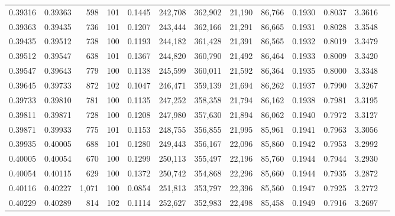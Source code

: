 \begin{tabular}{rrrrrrrrrrrrr}
0.39316 & 0.39363 &   598 & 101 &                                     0.1445 & 242,708 & 362,902 &  21,190 &  86,766 & 0.1930 & 0.8037 & 3.3616 \\
0.39363 & 0.39435 &   736 & 101 &                                     0.1207 & 243,444 & 362,166 &  21,291 &  86,665 & 0.1931 & 0.8028 & 3.3548 \\
0.39435 & 0.39512 &   738 & 100 &                                     0.1193 & 244,182 & 361,428 &  21,391 &  86,565 & 0.1932 & 0.8019 & 3.3479 \\
0.39512 & 0.39547 &   638 & 101 &                                     0.1367 & 244,820 & 360,790 &  21,492 &  86,464 & 0.1933 & 0.8009 & 3.3420 \\
0.39547 & 0.39643 &   779 & 100 &                                     0.1138 & 245,599 & 360,011 &  21,592 &  86,364 & 0.1935 & 0.8000 & 3.3348 \\
0.39645 & 0.39733 &   872 & 102 &                                     0.1047 & 246,471 & 359,139 &  21,694 &  86,262 & 0.1937 & 0.7990 & 3.3267 \\
0.39733 & 0.39810 &   781 & 100 &                                     0.1135 & 247,252 & 358,358 &  21,794 &  86,162 & 0.1938 & 0.7981 & 3.3195 \\
0.39811 & 0.39871 &   728 & 100 &                                     0.1208 & 247,980 & 357,630 &  21,894 &  86,062 & 0.1940 & 0.7972 & 3.3127 \\
0.39871 & 0.39933 &   775 & 101 &                                     0.1153 & 248,755 & 356,855 &  21,995 &  85,961 & 0.1941 & 0.7963 & 3.3056 \\
0.39935 & 0.40005 &   688 & 101 &                                     0.1280 & 249,443 & 356,167 &  22,096 &  85,860 & 0.1942 & 0.7953 & 3.2992 \\
0.40005 & 0.40054 &   670 & 100 &                                     0.1299 & 250,113 & 355,497 &  22,196 &  85,760 & 0.1944 & 0.7944 & 3.2930 \\
0.40054 & 0.40115 &   629 & 100 &                                     0.1372 & 250,742 & 354,868 &  22,296 &  85,660 & 0.1944 & 0.7935 & 3.2872 \\
0.40116 & 0.40227 & 1,071 & 100 &                                     0.0854 & 251,813 & 353,797 &  22,396 &  85,560 & 0.1947 & 0.7925 & 3.2772 \\
0.40229 & 0.40289 &   814 & 102 &                                     0.1114 & 252,627 & 352,983 &  22,498 &  85,458 & 0.1949 & 0.7916 & 3.2697 \\

\end{tabular}
